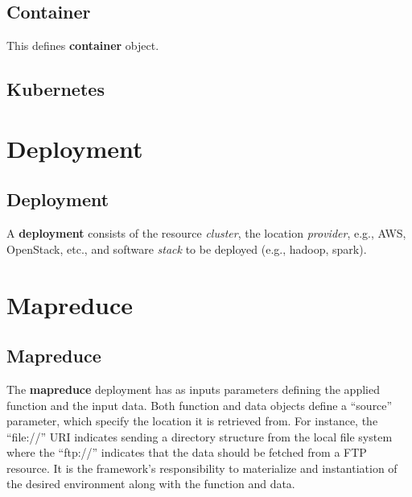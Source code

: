 \documentclass[9pt,twocolumn,twoside]{styles/osajnl}
\begin{document}
\subsection{Container}

This defines \textbf{container} object.


\subsection{Kubernetes}



\section{Deployment}

\subsection{Deployment}

A \textbf{deployment} consists of the resource \- \textit{cluster},
the location \- \textit{provider}, e.g., AWS, OpenStack, etc., and
software \textit{stack} to be deployed (e.g., hadoop, spark).


\section{Mapreduce}

\subsection{Mapreduce}

The \textbf{mapreduce} deployment has as inputs parameters defining
the applied function and the input data.  Both function and data
objects define a ``source'' parameter, which specify the location it
is retrieved from. For instance, the ``file://'' URI indicates sending
a directory structure from the local file system where the ``ftp://''
indicates that the data should be fetched from a FTP resource. It is
the framework's responsibility to materialize and instantiation of the
desired environment along with the function and data.
\end{document}
